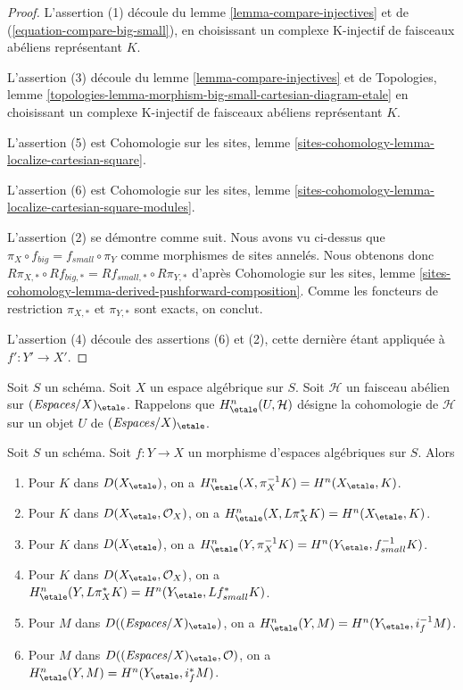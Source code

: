 \begin{proof}
L'assertion (1) découle du lemme \ref{lemma-compare-injectives}
et de (\ref{equation-compare-big-small}),
en choisissant un complexe K-injectif de faisceaux abéliens représentant $K$.

\medskip\noindent
L'assertion (3) découle du lemme \ref{lemma-compare-injectives}
et de Topologies, lemme
\ref{topologies-lemma-morphism-big-small-cartesian-diagram-etale}
en choisissant un complexe K-injectif de faisceaux abéliens représentant $K$.

\medskip\noindent
L'assertion (5) est Cohomologie sur les sites, lemme
\ref{sites-cohomology-lemma-localize-cartesian-square}.

\medskip\noindent
L'assertion (6) est Cohomologie sur les sites, lemme
\ref{sites-cohomology-lemma-localize-cartesian-square-modules}.

\medskip\noindent
L'assertion (2) se démontre comme suit. Nous avons vu ci-dessus que
$\pi_X \circ f_{big} = f_{small} \circ \pi_Y$ comme morphismes de sites
annelés. Nous obtenons donc
$R\pi_{X, *} \circ Rf_{big, *} = Rf_{small, *} \circ R\pi_{Y, *}$
d'après Cohomologie sur les sites, lemme
\ref{sites-cohomology-lemma-derived-pushforward-composition}.
Comme les foncteurs de restriction $\pi_{X, *}$ et $\pi_{Y, *}$
sont exacts, on conclut.

\medskip\noindent
L'assertion (4) découle des assertions (6) et (2), cette dernière étant
appliquée à $f' : Y' \to X'$.
\end{proof}

\noindent
Soit $S$ un schéma. Soit $X$ un espace algébrique sur $S$.
Soit $\mathcal{H}$ un faisceau abélien sur
$(\textit{Espaces}/X)_\etale$. Rappelons que $H^n_\etale(U, \mathcal{H})$
désigne la cohomologie de $\mathcal{H}$ sur un objet
$U$ de $(\textit{Espaces}/X)_\etale$.

\begin{lemma}
\label{lemma-compare-cohomology}
Soit $S$ un schéma.
Soit $f : Y \to X$ un morphisme d'espaces algébriques sur $S$. Alors
\begin{enumerate}
\item Pour $K$ dans $D(X_\etale)$, on a
$H^n_\etale(X, \pi_X^{-1}K) = H^n(X_\etale, K)$.
\item Pour $K$ dans $D(X_\etale, \mathcal{O}_X)$, on a
$H^n_\etale(X, L\pi_X^*K) = H^n(X_\etale, K)$.
\item Pour $K$ dans $D(X_\etale)$, on a
$H^n_\etale(Y, \pi_X^{-1}K) = H^n(Y_\etale, f_{small}^{-1}K)$.
\item Pour $K$ dans $D(X_\etale, \mathcal{O}_X)$, on a
$H^n_\etale(Y, L\pi_X^*K) = H^n(Y_\etale, Lf_{small}^*K)$.
\item Pour $M$ dans $D((\textit{Espaces}/X)_\etale)$, on a
$H^n_\etale(Y, M) = H^n(Y_\etale, i_f^{-1}M)$.
\item Pour $M$ dans $D((\textit{Espaces}/X)_\etale, \mathcal{O})$, on a
$H^n_\etale(Y, M) = H^n(Y_\etale, i_f^*M)$.
\end{enumerate}
\end{lemma}

